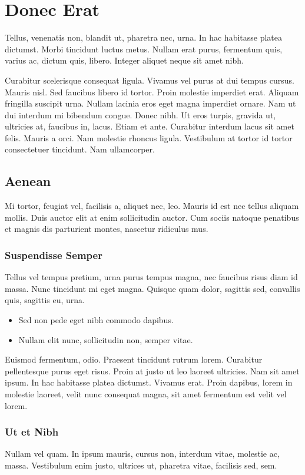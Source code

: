 \documentclass{article}
\begin{document}
\section{Donec Erat}

Tellus, venenatis non, blandit ut, pharetra nec, urna. In hac
habitasse platea dictumst. Morbi tincidunt luctus metus. Nullam erat
purus, fermentum quis, varius ac, dictum quis, libero. Integer aliquet
neque sit amet nibh.

Curabitur scelerisque consequat ligula. Vivamus vel purus at dui
tempus cursus. Mauris nisl. Sed faucibus libero id tortor. Proin
molestie imperdiet erat. Aliquam fringilla suscipit urna. Nullam
lacinia eros eget magna imperdiet ornare. Nam ut dui interdum mi
bibendum congue. Donec nibh. Ut eros turpis, gravida ut, ultricies at,
faucibus in, lacus. Etiam et ante. Curabitur interdum lacus sit amet
felis. Mauris a orci. Nam molestie rhoncus ligula. Vestibulum at
tortor id tortor consectetuer tincidunt. Nam ullamcorper.

\subsection{Aenean}

Mi tortor, feugiat vel, facilisis a, aliquet nec, leo. Mauris id est
nec tellus aliquam mollis. Duis auctor elit at enim sollicitudin
auctor. Cum sociis natoque penatibus et magnis dis parturient montes,
nascetur ridiculus mus.

\subsubsection{Suspendisse Semper}

Tellus vel tempus pretium, urna purus tempus magna, nec faucibus risus
diam id massa. Nunc tincidunt mi eget magna. Quisque quam dolor,
sagittis sed, convallis quis, sagittis eu, urna.

\begin{itemize}
\item{} Sed non pede eget nibh commodo dapibus.
\item{} Nullam elit nunc, sollicitudin non, semper vitae.
\end{itemize}

Euismod fermentum, odio. Praesent tincidunt rutrum lorem. Curabitur
pellentesque purus eget risus. Proin at justo ut leo laoreet
ultricies. Nam sit amet ipsum. In hac habitasse platea
dictumst. Vivamus erat. Proin dapibus, lorem in molestie laoreet,
velit nunc consequat magna, sit amet fermentum est velit vel lorem.

\subsubsection{Ut et Nibh}

Nullam vel quam. In ipsum mauris, cursus non, interdum vitae, molestie
ac, massa. Vestibulum enim justo, ultrices ut, pharetra vitae,
facilisis sed, sem.
\end{document}
